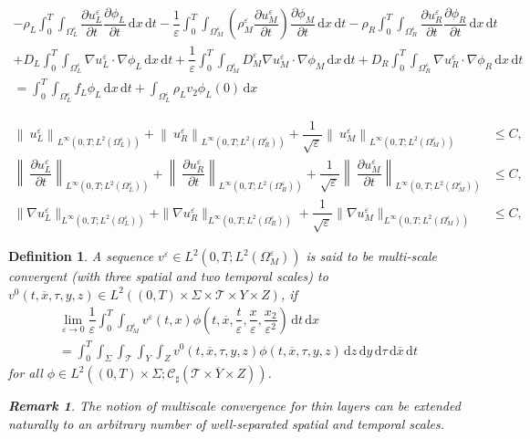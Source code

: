\documentclass[10pt,a4paper]{amsart}
\newtheorem{definition}{Definition}
\newtheorem{remark}{Remark}
\def\T{\mathcal{T}}
\newcommand{\di}[1]{\,\mathrm{d}#1}
\def\dzdy{\di{z}\di{y}\di{\tau}\di{\overline{x}}\di{t}}
\def\es{\varepsilon}
\def\mint{\int_{0}^{T}\int_{\Sigma}\int_{\mathcal{T}}\int_{Y}\int_{Z}}
\def\oll{\Omega_L^\varepsilon}
\def\omm{\Omega_M^\varepsilon}
\def\orr{\Omega_R^\varepsilon}
\begin{document}
\begin{multline}\label{eq:weakform}
    -\rho_L\int_0^T\int_{\oll}  \dfrac{\partial u_L^\es}{\partial t}  \dfrac{\partial \phi_L}{\partial t}\di{x}\di{t}-  \dfrac{1}{\es} \int_0^T\int_{\omm}  \left({\rho_M^\es} \dfrac{\partial u_M^\es}{\partial t}\right) \dfrac{\partial \phi_M}{\partial t}\di{x}\di{t} -    \rho_R\int_0^T\int_{\orr} \dfrac{\partial u_R^\es}{\partial t}\dfrac{\partial \phi_R}{\partial t} \di{x}\di{t}\\
    +D_L\int_0^T\int_{\oll}\nabla u_L^\es \cdot \nabla \phi_L   \di{x}\di{t} +   \dfrac{1}{\es}\int_0^T\int_{\omm}  D_M^\es  \nabla u_M^\es\cdot\nabla \phi_M \di{x}\di{t}+D_R\int_0^T\int_{\orr} \nabla u_R^\es\cdot\nabla \phi_R \di{x} \di{t}
   \\
    = \int_0^T\int_{\oll} f_L\phi_L \di{x}\di{t}+\int_{\oll}\rho_L v_2\phi_L(0)\di{x}
\end{multline}

	\begin{align}
     \left\|\ u_L^\es\right\|_{L^{\infty}(0,T;L^2(\oll))}+  \left\|\ u_R^\es\right\|_{L^{\infty}(0,T;L^2(\orr))}+  \dfrac{1}{\sqrt{\es}}\left\|\ u_M^\es\right\|_{L^{\infty}(0,T;L^2(\omm))}&\leq C,\label{eq:energy_estimate_1_case_1}\\
	    \left\|\ \dfrac{\partial u_L^\es}{\partial t}\right\|_{L^{\infty}(0,T;L^2(\oll))}+  \left\|\ \dfrac{\partial u_R^\es}{\partial t}\right\|_{L^{\infty}(0,T;L^2(\orr))}+  \dfrac{1}{\sqrt{\es}}\left\|\ \dfrac{\partial u_M^\es}{\partial t}\right\|_{L^{\infty}(0,T;L^2(\omm))}&\leq C,\label{eq:energy_estimate_2_case_1}\\
	    \|\nabla u_L^\es\|_{L^{\infty}(0,T;L^2(\oll))}+\|\nabla u_R^\es\|_{L^{\infty}(0,T;L^2(\orr))}+\dfrac{1}{\sqrt{\es}}\|\nabla u_M^\es\|_{L^{\infty}(0,T;L^2(\omm))}&\leq C\label{eq:energy_estimate_3_case_1},
	\end{align}

	\begin{definition}\label{def:multiscale_convergence}
A sequence $v^\es\in L^2(0,T;L^2(\omm))$ is said to be multi-scale convergent (with three spatial and two temporal scales) to $v^0(t,\overline{x},\tau,y,z)\in L^2((0,T)\times \Sigma\times  \T \times Y\times Z)$, if
\begin{multline*}
    \lim_{\es\rightarrow 0}\dfrac{1}{\es}\int_0^T\int_{\omm}v^\es(t,x)\phi\left(t,\overline{x},\dfrac{t}{\es},\dfrac{x}{\es},\dfrac{x_2}{\es^2}\right)\di{t}\di{x}\\
=\mint v^0(t,\overline{x},\tau,y,z)\phi(t,\overline{x},\tau,y,z)\dzdy
\end{multline*}
for all $\phi \in L^2((0,T)\times \Sigma;\mathcal{C}_{\sharp}(\overline{\T\times Y\times Z}))$.
\newline

\begin{remark}
    The notion of multiscale convergence for thin layers can be extended naturally to an arbitrary number of well-separated spatial and temporal scales.
\end{remark}
	\end{definition}
\end{document}
